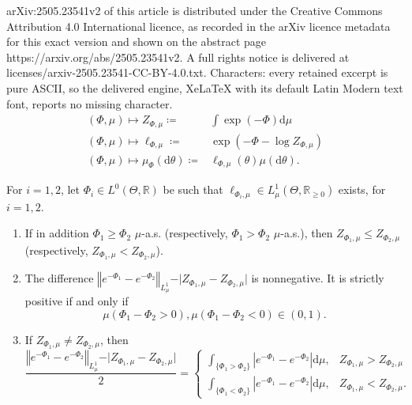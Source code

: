 \documentclass[10pt,a4paper]{amsart}
\newcommand{\Abs}[1]{\left\vert#1\right\vert}
\newcommand{\Norm}[1]{\left\Vert #1 \right\Vert}
\newcommand{\R}{\mathbb{R}}
\newcommand{\abs}[1]{\vert #1\vert}
\newcommand{\rd}{\mathrm{d}}
\begin{document}
arXiv:2505.23541v2 of this article is distributed under the Creative Commons Attribution 4.0 International licence, as recorded in the arXiv licence metadata for this exact version and shown on the abstract page https://arxiv.org/abs/2505.23541v2. A full rights notice is delivered at licenses/arxiv-2505.23541-CC-BY-4.0.txt. Characters: every retained excerpt is pure ASCII, so the delivered engine, XeLaTeX with its default Latin Modern text font, reports no missing character.
 \begin{align}
 (\Phi,\mu)\mapsto Z_{\Phi,\mu}\coloneqq & \int \exp(-\Phi)\rd \mu
 \label{eq_normalisationConstant_function}
 \\
  (\Phi,\mu)\mapsto \ell_{\Phi,\mu}\coloneqq & \exp\left( -\Phi-\log Z_{\Phi,\mu}\right) 
  \label{eq_likelihood_function}
  \\
  (\Phi,\mu)\mapsto \mu_{\Phi}(\rd \theta) \coloneqq & \ell_{\Phi,\mu}(\theta)\mu(\rd \theta).
  \label{eq_posterior_function}
\end{align}

\begin{lemma}
 \label{lemma_L1norm_difference_of_unnormalised_likelihoods_minus_abs_diff_normalisation_constants_misfit_perturbation}
For $i=1,2$, let $\Phi_i\in L^0(\Theta,\R)$ be such that $\ell_{\Phi_i,\mu}\in L^1_\mu(\Theta,\R_{\geq 0})$ exists, for $i=1,2$.
\begin{enumerate}
\item \label{item1_lemma_L1norm_difference_of_unnormalised_likelihoods_minus_abs_diff_normalisation_constants_misfit_perturbation} If in addition $\Phi_1\geq \Phi_2$ $\mu$-a.s. (respectively, $\Phi_1>\Phi_2$ $\mu$-a.s.), then $Z_{\Phi_1,\mu}\leq Z_{\Phi_2,\mu}$ (respectively, $Z_{\Phi_1,\mu}< Z_{\Phi_2,\mu}$). 

\item \label{item2_lemma_L1norm_difference_of_unnormalised_likelihoods_minus_abs_diff_normalisation_constants_misfit_perturbation} 
The difference $\Norm{e^{-\Phi_1}-e^{-\Phi_2}}_{L^1_\mu}- \abs{Z_{\Phi_1,\mu}-Z_{\Phi_2,\mu}}$ is nonnegative. It is strictly positive if and only if
\begin{equation}
\label{eq_hypothesis_difference_of_misfits_changes_sign_mu_almost_surely}
 \mu(\Phi_1-\Phi_2>0), \mu(\Phi_1-\Phi_2<0) \in (0,1).
\end{equation}

\item \label{item3_lemma_L1norm_difference_of_unnormalised_likelihoods_minus_abs_diff_normalisation_constants_misfit_perturbation}
If $Z_{\Phi_1,\mu}\neq Z_{\Phi_2,\mu}$, then 
\begin{equation*}
\frac{\Norm{e^{-\Phi_1}-e^{-\Phi_2}}_{L^1_\mu}- \abs{Z_{\Phi_1,\mu}-Z_{\Phi_2,\mu}}}{2}=
 \begin{cases}
 \int_{\{\Phi_1>\Phi_2\}} \Abs{e^{-\Phi_1}-e^{-\Phi_2}}\rd \mu, & Z_{\Phi_1,\mu}>Z_{\Phi_2,\mu}
  \\
\int_{\{\Phi_1<\Phi_2\}} \Abs{e^{-\Phi_1}-e^{-\Phi_2}}\rd \mu, & Z_{\Phi_1,\mu}<Z_{\Phi_2,\mu}.
 \end{cases}
\end{equation*}
\end{enumerate}
\end{lemma}
\end{document}
